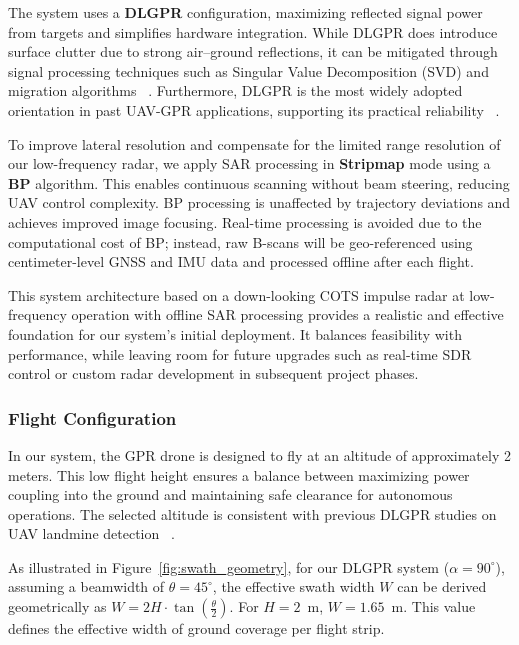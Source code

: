 The system uses a \textbf{DLGPR} configuration, maximizing reflected signal power from targets and simplifies hardware integration. While DLGPR does introduce surface clutter due to strong air–ground reflections, it can be mitigated through signal processing techniques such as Singular Value Decomposition (SVD) and migration algorithms ~\cite{garcia2024comparison}. Furthermore, DLGPR is the most widely adopted orientation in past UAV-GPR applications, supporting its practical reliability ~\cite{alqudsi2021review}.

To improve lateral resolution and compensate for the limited range resolution of our low-frequency radar, we apply SAR processing in \textbf{Stripmap} mode using a \textbf{BP} algorithm. This enables continuous scanning without beam steering, reducing UAV control complexity. BP processing is unaffected by trajectory deviations and achieves improved image focusing. Real-time processing is avoided due to the computational cost of BP; instead, raw B-scans will be geo-referenced using centimeter-level GNSS and IMU data and processed offline after each flight.


This system architecture based on a down-looking COTS impulse radar at low-frequency operation with offline SAR processing provides a realistic and effective foundation for our system’s initial deployment. It balances feasibility with performance, while leaving room for future upgrades such as real-time SDR control or custom radar development in subsequent project phases.



\subsubsection{Flight Configuration}

In our system, the GPR drone is designed to fly at an altitude of approximately 2 meters. This low flight height ensures a balance between maximizing power coupling into the ground and maintaining safe clearance for autonomous operations. The selected altitude is consistent with previous DLGPR studies on UAV landmine detection ~\cite{schartel2018uav,alqudsi2021review}.

As illustrated in Figure~\ref{fig:swath_geometry}, for our DLGPR system ($\alpha = 90^\circ$), assuming a beamwidth of $\theta = 45^\circ$, the effective swath width $W$ can be derived geometrically as \(W = 2H \cdot \tan\left(\frac{\theta}{2}\right)\). For $H = 2$~m,  $W = 1.65$~m. This value defines the effective width of ground coverage per flight strip.

